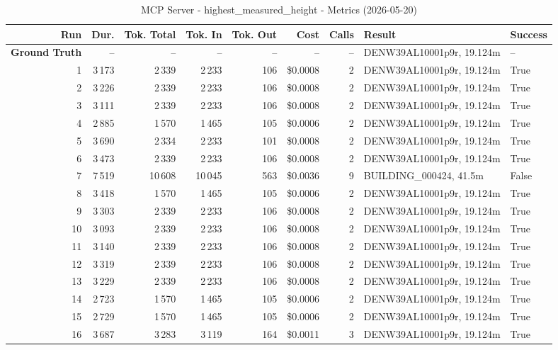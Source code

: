 \documentclass[a4paper,11pt]{article}
\begin{document}
\begin{table}[ht]
\centering
\scriptsize
\caption{MCP Server - highest\_measured\_height - Metrics (2026-05-20)}
\label{tab:mcp\_highest\_measured\_height\_metrics\_2026-05-20}
\begin{tabular}{r r r r r r r p{3cm} l}
\hline
Run & Dur. & Tok. Total & Tok. In & Tok. Out & Cost & Calls & Result & Success \\
\hline
\textbf{Ground Truth} & -- & -- & -- & -- & -- & -- & DENW39AL10001p9r, 19.124m & -- \\
\hline
1 & 3\,173 & 2\,339 & 2\,233 & 106 & \$0.0008 & 2 & DENW39AL10001p9r, 19.124m & True \\
2 & 3\,226 & 2\,339 & 2\,233 & 106 & \$0.0008 & 2 & DENW39AL10001p9r, 19.124m & True \\
3 & 3\,111 & 2\,339 & 2\,233 & 106 & \$0.0008 & 2 & DENW39AL10001p9r, 19.124m & True \\
4 & 2\,885 & 1\,570 & 1\,465 & 105 & \$0.0006 & 2 & DENW39AL10001p9r, 19.124m & True \\
5 & 3\,690 & 2\,334 & 2\,233 & 101 & \$0.0008 & 2 & DENW39AL10001p9r, 19.124m & True \\
6 & 3\,473 & 2\,339 & 2\,233 & 106 & \$0.0008 & 2 & DENW39AL10001p9r, 19.124m & True \\
7 & 7\,519 & 10\,608 & 10\,045 & 563 & \$0.0036 & 9 & BUILDING\_000424, 41.5m & False \\
8 & 3\,418 & 1\,570 & 1\,465 & 105 & \$0.0006 & 2 & DENW39AL10001p9r, 19.124m & True \\
9 & 3\,303 & 2\,339 & 2\,233 & 106 & \$0.0008 & 2 & DENW39AL10001p9r, 19.124m & True \\
10 & 3\,093 & 2\,339 & 2\,233 & 106 & \$0.0008 & 2 & DENW39AL10001p9r, 19.124m & True \\
11 & 3\,140 & 2\,339 & 2\,233 & 106 & \$0.0008 & 2 & DENW39AL10001p9r, 19.124m & True \\
12 & 3\,319 & 2\,339 & 2\,233 & 106 & \$0.0008 & 2 & DENW39AL10001p9r, 19.124m & True \\
13 & 3\,229 & 2\,339 & 2\,233 & 106 & \$0.0008 & 2 & DENW39AL10001p9r, 19.124m & True \\
14 & 2\,723 & 1\,570 & 1\,465 & 105 & \$0.0006 & 2 & DENW39AL10001p9r, 19.124m & True \\
15 & 2\,729 & 1\,570 & 1\,465 & 105 & \$0.0006 & 2 & DENW39AL10001p9r, 19.124m & True \\
16 & 3\,687 & 3\,283 & 3\,119 & 164 & \$0.0011 & 3 & DENW39AL10001p9r, 19.124m & True \\

\end{tabular}
\end{table}
\end{document}
